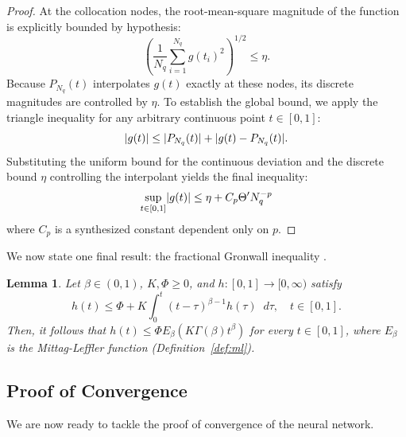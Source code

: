 \documentclass[11pt, a4paper]{article}
\theoremstyle{theoremstyle}
\newtheorem{lemma}[theorem]{Lemma}
\theoremstyle{definitionstyle}
\newcommand{\dd}{\mathop{}\!d}
\DeclarePairedDelimiter{\abs}{\lvert}{\rvert}
\begin{document}
\begin{proof}
At the collocation nodes, the root-mean-square magnitude of the function is explicitly bounded by hypothesis:
\begin{equation}
    \left ( \frac{1}{N_q} \sum_{i=1}^{N_q} g(t_i)^2 \right )^{1/2} \le \eta.
\end{equation}
Because \( P_{N_q}(t) \) interpolates \( g(t) \) exactly at these nodes, its discrete magnitudes are controlled by \( \eta \). To establish the global bound, we apply the triangle inequality for any arbitrary continuous point \( t \in [0,1] \):
\begin{equation}
    \abs{g(t)} \le \abs{P_{N_q}(t)} + \abs{g(t) - P_{N_q}(t)}.
\end{equation}
Substituting the uniform bound for the continuous deviation and the discrete bound \( \eta \) controlling the interpolant yields the final inequality:
\begin{equation}
    \sup_{t \in [0,1]} \abs{g(t)} \le \eta + C_p \Theta' N_q^{-p}
\end{equation}
where \( C_p \) is a synthesized constant dependent only on \( p \).
\end{proof}

We now state one final result: the fractional Gronwall inequality \cite{YE20071075}.

\begin{lemma}\label{lem:3.5}
    Let \( \beta \in (0,1) \), \(K, \Phi \geq 0\), and \(h : [0, 1] \to [0, \infty)\) satisfy
    \begin{equation}
        h(t) \leq \Phi + K\int_0^t (t - \tau)^{\beta-1}h(\tau)\dd{\tau}, \quad t \in [0, 1].
    \end{equation}
    Then, it follows that \( h(t) \leq \Phi E_\beta(K\Gamma(\beta)t^{\beta}) \) for every \(t \in [0, 1]\), where \(E_\beta\) is the Mittag-Leffler function (Definition~\ref{def:ml}).
\end{lemma}

\subsection{Proof of Convergence}
We are now ready to tackle the proof of convergence of the neural network.
\end{document}
